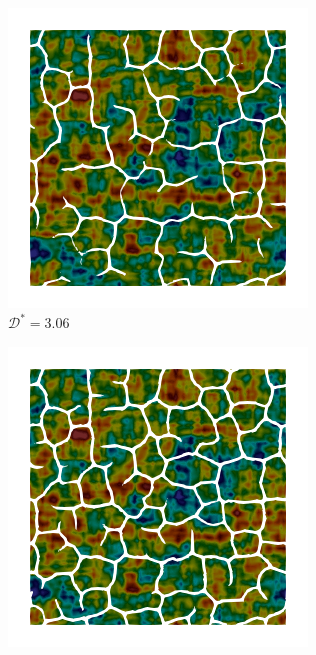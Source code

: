 \begin{figure}[!htbp]
  \begin{subfigure}[b]{0.25\textwidth}
    \includegraphics[width=\textwidth]{Chapter4/figures/2D/psic_exp_cartesian_5_5_rho_0_seed_b_with_crack_140.png}
    \caption{$\mathcal{D}^* = 3.06$}
    \label{fig: Chapter4/2D/psic_exp_cartesian_5_5_rho_0_seed_a_with_crack_140}
  \end{subfigure}
  \begin{subfigure}[b]{0.25\textwidth}
    \includegraphics[width=\textwidth]{Chapter4/figures/2D/psic_exp_cartesian_5_5_rho_0_seed_b_with_crack_160.png}

\end{subfigure}
\end{figure}
